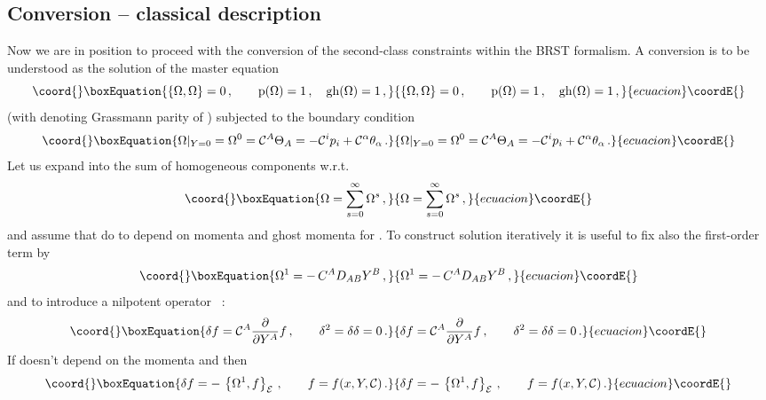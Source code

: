 \documentclass[a4paper,11pt]{amsart}
\numberwithin{thm}{section} %
\numberwithin{equation}{section} %
\numberwithin{figure}{section} %
\providecommand{\pb}[2]{\left\{{}#1{},{}#2{}\right\}}
\providecommand{\gh}[1]{{\rm gh}(#1)}
\providecommand{\p}[1]{{\rm p}(#1)}
\renewcommand{\:}{{\rm\, :\,}}
\def\d{\partial}
\providecommand{\dl}[1]{\displaystyle\frac{{\d}}{\d #1}}
\def\cP{{\mathcal P}}
\def\cc{{\mathcal C}}
\def\E{{ \mathcal E}}
\begin{document}
\subsection{Conversion -- classical description}

Now we are in position to proceed with the conversion
of the second-class constraints \coordHE{} within the BRST
formalism.  A conversion is to be understood as
the solution of the master equation
\begin{equation}\coord{}\boxEquation{
  \label{eq:master-cl}
  \pb{\Omega}{\Omega}=0\,, \qquad \p{\Omega}=1\,, \quad \gh{\Omega}=1\,,
}{
  \pb{\Omega}{\Omega}=0\,, \qquad \p{\Omega}=1\,, \quad \gh{\Omega}=1\,,
}{ecuacion}\coordE{}\end{equation}
(with \myHighlight{$\p{\Omega}$}\coordHE{} denoting Grassmann parity of \myHighlight{$\Omega$}\coordHE{})
subjected to the boundary condition
\begin{equation}\coord{}\boxEquation{
\label{eq:boundary-cl}
\Omega|_{Y=0}=\Omega^0=\cc^A\Theta_A=-\cc^ip_i+\cc^\alpha\theta_\alpha\,.
}{
\Omega|_{Y=0}=\Omega^0=\cc^A\Theta_A=-\cc^ip_i+\cc^\alpha\theta_\alpha\,.
}{ecuacion}\coordE{}\end{equation}
Let us expand \myHighlight{$\Omega$}\coordHE{} into the sum of homogeneous
components w.r.t. \coordHE{}
\begin{equation}\coord{}\boxEquation{
  \Omega=\sum_{s=0}^\infty \Omega^s\,,
}{
  \Omega=\sum_{s=0}^\infty \Omega^s\,,
}{ecuacion}\coordE{}\end{equation}
and assume
that \coordHE{} do to depend on momenta \coordHE{} and ghost
momenta \myHighlight{$\cP^A$}\coordHE{} for \coordHE{}.  To construct solution iteratively it is useful to
fix also the first-order term by
\begin{equation}\coord{}\boxEquation{
  \label{eq:1-2-terms}
\Omega^1 = -\,C^A D_{AB}Y^B\,,
}{
  \Omega^1 = -\,C^A D_{AB}Y^B\,,
}{ecuacion}\coordE{}\end{equation}
and to introduce a nilpotent operator \myHighlight{$\delta$}\coordHE{}
~\cite{[BT],[Fedosov-JDG],[GL]}:
\begin{equation}\coord{}\boxEquation{
  \delta f = \cc^A\dl{Y^A} f\,,\qquad  \delta^2=\delta\delta=0\,.
}{
  \delta f = \cc^A\dl{Y^A} f\,,\qquad  \delta^2=\delta\delta=0\,.
}{ecuacion}\coordE{}\end{equation}
If \coordHE{} doesn't depend on the momenta \coordHE{} and \myHighlight{$\cP_A$}\coordHE{} then
\begin{equation}\coord{}\boxEquation{
  \delta f = -\,\pb{\Omega^1}{f}_\E\,,  \qquad f=f(x,Y,\cc)\,.
}{
  \delta f = -\,\pb{\Omega^1}{f}_\E\,,  \qquad f=f(x,Y,\cc)\,.
}{ecuacion}\coordE{}\end{equation}
\end{document}
